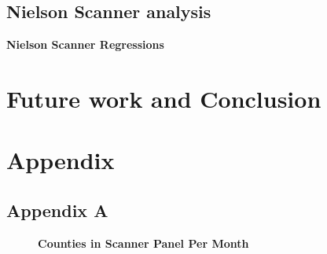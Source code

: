 \documentclass[11pt]{article}
\begin{document}
\subsection{Nielson Scanner analysis}

\begin{center}
	
	\centering
	
	\textbf{Nielson Scanner Regressions }\par\medskip
	\scalebox{.8}{
		
	}
\end{center}






\section{Future work and Conclusion }







\section{Appendix}

\subsection{Appendix A}

\begin{figure}[H]
	\centering
	\LARGE{\textbf{Counties in Scanner Panel Per Month}}\par\medskip
	\scalebox{.6}{
	
}
	\scalebox{.6}{
	
}
\end{figure}


\end{document}
